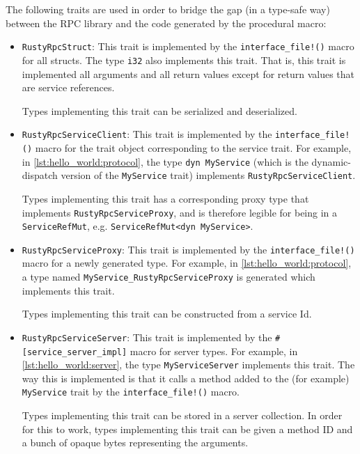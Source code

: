 \documentclass[11pt, twocolumn]{article}
\begin{document}
The following traits are used in order to bridge the gap (in a type-safe way) between the RPC library and the code generated by the procedural macro:
\begin{itemize}
    \item \texttt{RustyRpcStruct}: This trait is implemented by the \texttt{interface\_file!()} macro for all structs. The type \texttt{i32} also implements this trait. That is, this trait is implemented all arguments and all return values except for return values that are service references.
    
    Types implementing this trait can be serialized and deserialized.
    
    \item \texttt{RustyRpcServiceClient}: This trait is implemented by the \texttt{interface\_file!()} macro for the trait object corresponding to the service trait. For example, in \ref{lst:hello_world:protocol}, the type \texttt{dyn MyService} (which is the dynamic-dispatch version of the \texttt{MyService} trait) implements \texttt{RustyRpcServiceClient}.
    
    Types implementing this trait has a corresponding proxy type that implements \texttt{RustyRpcServiceProxy}, and is therefore legible for being in a \texttt{ServiceRefMut}, e.g. \texttt{ServiceRefMut<dyn MyService>}.
    
    \item \texttt{RustyRpcServiceProxy}: This trait is implemented by the \texttt{interface\_file!()} macro for a newly generated type. For example, in \ref{lst:hello_world:protocol}, a type named \texttt{MyService\_RustyRpcServiceProxy} is generated which implements this trait.
    
    Types implementing this trait can be constructed from a service Id.
    
    \item \texttt{RustyRpcServiceServer}: This trait is implemented by the \texttt{\#[service\_server\_impl]} macro for server types. For example, in \ref{lst:hello_world:server}, the type \texttt{MyServiceServer} implements this trait. The way this is implemented is that it calls a method added to the (for example) \texttt{MyService} trait by the \texttt{interface\_file!()} macro.
    
    Types implementing this trait can be stored in a server collection. In order for this to work, types implementing this trait can be given a method ID and a bunch of opaque bytes representing the arguments.
    

\end{itemize}
\end{document}
